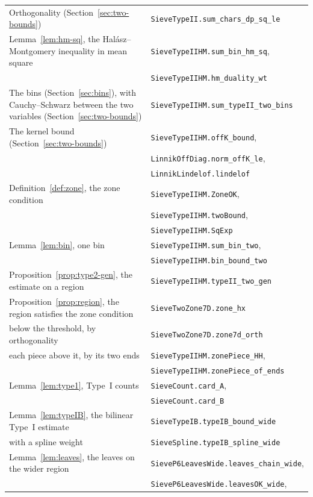 \documentclass[11pt]{article}
\theoremstyle{definition}
\newcommand{\lean}[1]{\texttt{#1}}
\begin{document}
{\begin{longtable}{@{}>{\raggedright\arraybackslash}p{}l@{}}
Orthogonality (Section~\ref{sec:two-bounds}) & \lean{SieveTypeII.sum\_chars\_dp\_sq\_le} \\
Lemma~\ref{lem:hm-sq}, the Hal\'asz--Montgomery inequality in mean square & \lean{SieveTypeIIHM.sum\_bin\_hm\_sq}, \\
 & \lean{SieveTypeIIHM.hm\_duality\_wt} \\
The bins (Section~\ref{sec:bins}), with Cauchy--Schwarz between the two variables (Section~\ref{sec:two-bounds}) &
\lean{SieveTypeIIHM.sum\_typeII\_two\_bins} \\
The kernel bound (Section~\ref{sec:two-bounds}) & \lean{SieveTypeIIHM.offK\_bound}, \\
 & \lean{LinnikOffDiag.norm\_offK\_le}, \\
 & \lean{LinnikLindelof.lindelof} \\
Definition~\ref{def:zone}, the zone condition & \lean{SieveTypeIIHM.ZoneOK}, \\
 & \lean{SieveTypeIIHM.twoBound}, \\
 & \lean{SieveTypeIIHM.SqExp} \\
Lemma~\ref{lem:bin}, one bin & \lean{SieveTypeIIHM.sum\_bin\_two}, \\
 & \lean{SieveTypeIIHM.bin\_bound\_two} \\
Proposition~\ref{prop:type2-gen}, the estimate on a region & \lean{SieveTypeIIHM.typeII\_two\_gen} \\
Proposition~\ref{prop:region}, the region satisfies the zone condition & \lean{SieveTwoZone7D.zone\_hx} \\
\quad below the threshold, by orthogonality & \lean{SieveTwoZone7D.zone7d\_orth} \\
\quad each piece above it, by its two ends & \lean{SieveTypeIIHM.zonePiece\_HH}, \\
 & \lean{SieveTypeIIHM.zonePiece\_of\_ends} \\
Lemma~\ref{lem:type1}, Type~I counts & \lean{SieveCount.card\_A}, \\
 & \lean{SieveCount.card\_B} \\
Lemma~\ref{lem:typeIB}, the bilinear Type~I estimate & \lean{SieveTypeIB.typeIB\_bound\_wide} \\
\quad with a spline weight & \lean{SieveSpline.typeIB\_spline\_wide} \\
Lemma~\ref{lem:leaves}, the leaves on the wider region & \lean{SieveP6LeavesWide.leaves\_chain\_wide}, \\
 & \lean{SieveP6LeavesWide.leavesOK\_wide}, \\

\end{longtable}}
\end{document}
